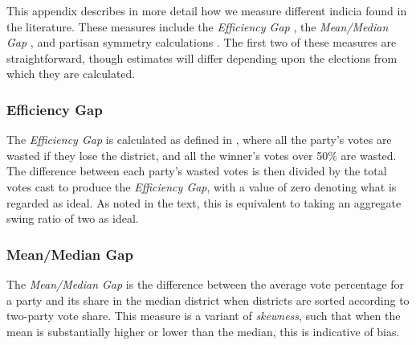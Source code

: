 \label{app:A}
\setcounter{table}{0} \renewcommand{\thetable}{A.\arabic{table}}
\setcounter{figure}{0} \renewcommand{\thefigure}{A.\arabic{figure}}
\setcounter{footnote}{0}



This appendix describes in more detail how we measure different indicia found in the literature. These measures include the \textit{Efficiency Gap} \citep{McGhee2017}, the \textit{Mean/Median Gap} \citep{Best2018}, and partisan symmetry calculations \citep{Grofman2007, Mcgann_et_al_2015_ELJ, McGann_et_al_2016_gerrymandering}. The first two of these measures are straightforward, though estimates will differ depending upon the elections from which they are calculated.

\subsubsection*{Efficiency Gap}
The \textit{Efficiency Gap} is calculated as defined in \citet{Mcghee2014}, where all the party’s votes are wasted if they lose the district, and all the winner’s votes over 50\% are wasted.  The difference between each party’s wasted votes is then divided by the total votes cast to produce the \textit{Efficiency Gap}, with a value of zero denoting what is regarded as ideal.  As noted in the text, this is equivalent to taking an aggregate swing ratio of two as ideal. 

\subsubsection*{Mean/Median Gap}
The \textit{Mean/Median Gap} is the difference between the average vote percentage for a party and its share in the median district when districts are sorted according to two-party vote share.  This measure is a variant of \textit{skewness}, such that when the mean is substantially higher or lower than the median, this is indicative of bias.

